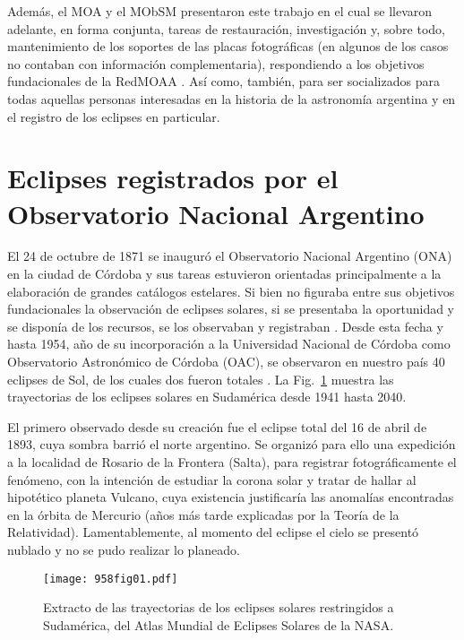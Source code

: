\documentclass[baaa]{baaa}
\begin{document}
Además, el MOA y el MObSM presentaron este trabajo en el cual se llevaron adelante, en forma conjunta, tareas de restauración,
investigación y, sobre todo, mantenimiento de los soportes de las placas fotográficas (en algunos de los casos no contaban con información complementaria),
respondiendo a los objetivos fundacionales de la RedMOAA \citep{2023BAAA...64..323M}. Así como, también,
para ser socializados para todas aquellas personas interesadas en la historia de la astronomía argentina y en el registro de los eclipses en particular.


\section{Eclipses registrados por el Observatorio Nacional Argentino}\label{ecli}

El 24 de octubre de 1871 se inauguró el Observatorio Nacional Argentino (ONA) en la ciudad de Córdoba y sus tareas estuvieron
orientadas principalmente a la elaboración de grandes catálogos estelares.
Si bien no figuraba entre sus objetivos fundacionales la observación de eclipses solares, si se presentaba la oportunidad y se disponía de los recursos, se los
observaban y registraban \citep{cbaestelar24}.
Desde esta fecha y hasta 1954, año de su incorporación a la Universidad Nacional de Córdoba como Observatorio Astronómico de Córdoba (OAC),
se observaron en nuestro país 40 eclipses de Sol, de los cuales dos fueron totales \citep{blogsp18}. 
La Fig.~\ref{fig1} muestra las trayectorias de los eclipses solares en Sudamérica desde 1941 hasta 2040.

El primero observado desde su creación fue el eclipse total del 16 de abril de 1893, cuya sombra barrió el norte argentino.
Se organizó para ello una expedición a la localidad de Rosario de la Frontera (Salta), para registrar fotográficamente el fenómeno, con la intención de estudiar la corona solar
y tratar de hallar al hipotético planeta Vulcano, cuya existencia justificaría las anomalías encontradas en la órbita de Mercurio (años más tarde explicadas por la Teoría
de la Relatividad). Lamentablemente, al momento del eclipse el cielo se presentó nublado y no se pudo realizar lo planeado. 

\begin{figure}[!t]
\centering
\texttt{[image: 958fig01.pdf]}
\caption{Extracto de las trayectorias de los eclipses solares restringidos a Sudamérica, del Atlas Mundial de Eclipses Solares de la NASA.}
\label{fig1}
\end{figure}
\end{document}
